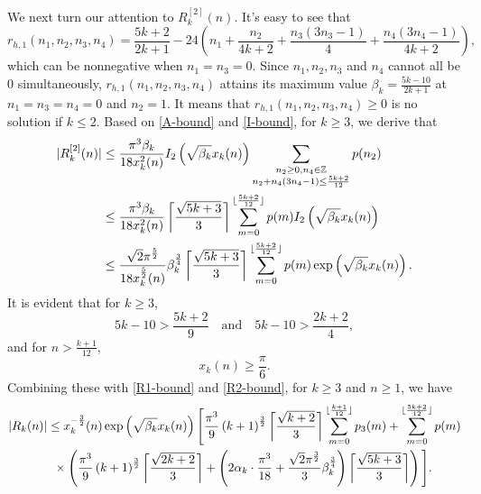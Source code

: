\documentclass[12pt]{article}
\numberwithin{equation}{section}
\begin{document}
We next turn our attention to $R_{k}^{[2]}(n)$. It's easy to see that
\begin{equation*}
r_{h,1}(n_1,n_2,n_3,n_4)=\frac{5k+2}{2k+1}-24\left(n_1+
\frac{n_2}{4k+2}+
\frac{n_3(3n_3-1)}4+\frac{n_4(3n_4-1)}{4k+2}\right),
\end{equation*}
which can be nonnegative when $n_1=n_3=0$. Since $n_1,n_2,n_3$ and
$n_4$ cannot all be $0$ simultaneously, $r_{h,1}(n_1,n_2,n_3,n_4)$ attains its maximum value $\beta_k=\frac{5k-10}{2k+1}$ at $n_1=n_3=n_4=0$ and $n_2=1$. It means that $r_{h,1}(n_1,n_2,n_3,n_4)\geq 0$ is no solution if $k\leq 2$. Based on \eqref{A-bound} and \eqref{I-bound}, for $k\geq 3$, we derive that
\begin{align}\label{R2-bound}
|R_{k}^{[2]}(n)|
&\leq \frac{\pi^3\beta_k}{18x^2_{k}(n)}
I_{2} \left( \sqrt{\beta_k}x_{k}(n) \right)
\sum_{\substack{n_2\geq 0,n_4\in \mathbb{Z} \\n_2+n_4(3n_4-1)\leq \frac{5k+2}{12}}}p(n_2)
\notag\\
&\leq \frac{\pi^3\beta_k}{18x^2_{k}(n)}
\left\lceil\frac{\sqrt{5k +3}}{3}\right\rceil
\sum_{m=0}^{\lfloor\frac{5k+2}{12}\rfloor}p(m)
I_{2} \left( \sqrt{\beta_k}x_{k}(n) \right)
\notag\\
&\leq \frac{\sqrt{2}\pi^{\frac{5}{2}}}{18x_{k}^{\frac{5}{2}}(n)} \beta_k^{\frac{3}{4}}
\left\lceil\frac{\sqrt{5k +3}}{3}\right\rceil
\sum_{m=0}^{\lfloor\frac{5k+2}{12}\rfloor}p(m)
\exp\left( \sqrt{\beta_k}x_{k}(n) \right).
\end{align}
It is evident that for $k \geq 3$,
\begin{equation*}
5k-10>\frac{5k+2}{9}\quad \text{and} \quad 5k-10>\frac{2k+2}{4},
\end{equation*}
and for $n>\frac{k+1}{12}$,
\begin{equation*}
x_{k}(n)\geq \frac{\pi}{6}.
\end{equation*}
Combining these with \eqref{R1-bound} and \eqref{R2-bound}, for $k\geq 3$ and $n\geq 1$, we have
\begin{align}\label{bound:Rk1}
&|R_{k}(n)|
\leq x_{k}^{-\frac{3}{2}}(n)
\exp\left( \sqrt{\beta_k} x_{k}(n)\right)
\Bigg[\frac{\pi^3}{9}\left(k+1\right)^{\frac32}
\left\lceil\frac{\sqrt{k +2}}{3}\right\rceil
\sum_{m=0}^{\lfloor\frac{k+1}{12}\rfloor}p_3(m)
+\sum_{m=0}^{\lfloor\frac{5k+2}{12}\rfloor}p(m)
\notag\\
&\qquad\quad~~\times\left(\frac{\pi^3}{9}\left(k+1\right)^{\frac32}
\left\lceil\frac{\sqrt{2k +2}}{3}\right\rceil+\left(2\alpha_k\cdot\frac{\pi^3}{18}
+\frac{\sqrt{2}\pi^{\frac{3}{2}}}{3} \beta_k^{\frac{3}{4}}\right)\left\lceil\frac{\sqrt{5k +3}}{3}\right\rceil\right)\Bigg].
\end{align}
\end{document}
